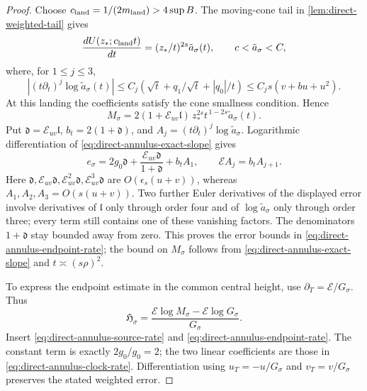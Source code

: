 \begin{proof}
Choose \(c_{\rm land}=1/(2m_{\rm land})>4\sup B\).
The moving-cone tail in \cref{lem:direct-weighted-tail} gives
\[
 \frac{dU(z_*;c_{\rm land}t)}{dt}
       =(z_*/t)^{2s}\tilde a_\sigma(t),\qquad c<\tilde a_\sigma<C,
\]
where, for \(1\le j\le3\),
\[
 |(t\partial_t)^j\log\tilde a_\sigma(t)|
 \le C_j(\sqrt t+q_1/\sqrt t+|q_0|/t)
 \le C_js(v+bu+u^2).
\]
At this landing the coefficients satisfy the cone smallness
condition. Hence
\begin{equation}
\label{eq:direct-annulus-exact-slope}
 M_\sigma=2(1+\mathcal E_{uv}\mathfrak l)\,
             z_*^{2s}t^{\,1-2s}\tilde a_\sigma(t).
\end{equation}
Put \(\mathfrak d=\mathcal E_{uv}\mathfrak l\), \(b_t=2(1+\mathfrak d)\), and
\(A_j=(t\partial_t)^j\log\tilde a_\sigma\). Logarithmic
differentiation of \eqref{eq:direct-annulus-exact-slope}
gives
\[
 e_\sigma=2g_0\mathfrak d+\frac{\mathcal E_{uv}\mathfrak d}{1+\mathfrak d}
          +b_tA_1,
 \qquad \mathcal E A_j=b_tA_{j+1}.
\]
Here \(\mathfrak d,\mathcal E_{uv}\mathfrak d,\mathcal E_{uv}^2\mathfrak d,
 \mathcal E_{uv}^3\mathfrak d\) are \(O(\epsilon_s(u+v))\), whereas
\(A_1,A_2,A_3=O(s(u+v))\). Two further Euler derivatives
of the displayed error involve derivatives of \(\mathfrak l\)
only through order four and of \(\log\tilde a_\sigma\) only
through order three; every term still contains one of these
vanishing factors. The denominators \(1+\mathfrak d\) stay bounded
away from zero. This proves the error bounds in
\eqref{eq:direct-annulus-endpoint-rate}; the bound on \(M_\sigma\)
follows from \eqref{eq:direct-annulus-exact-slope} and
\(t\asymp(s\rho)^2\).

To express the endpoint estimate in the common central height, use
\(\partial_T=\mathcal E/G_\sigma\). Thus
\[
 \mathfrak H_\sigma
   =\frac{\mathcal E\log M_\sigma
                      -\mathcal E\log G_\sigma}{G_\sigma}.
\]
Insert \eqref{eq:direct-annulus-source-rate} and
\eqref{eq:direct-annulus-endpoint-rate}. The constant term
is exactly \(2g_0/g_0=2\); the two linear coefficients
are those in \eqref{eq:direct-annulus-clock-rate}.
Differentiation using \(u_T=-u/G_\sigma\) and
\(v_T=v/G_\sigma\) preserves the stated weighted error.
\end{proof}

